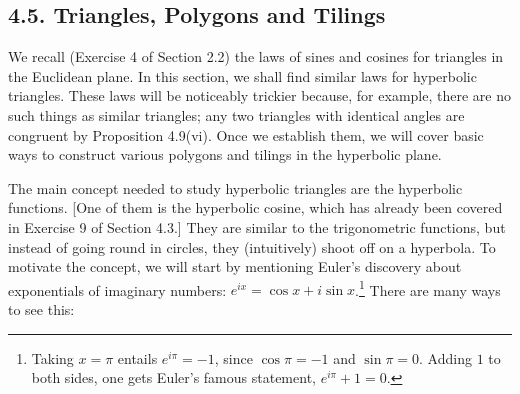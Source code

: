 \documentclass[leqno]{book}
\begin{document}
\subsection*{4.5. Triangles, Polygons and Tilings}
We recall (Exercise 4 of Section 2.2) the laws of sines and cosines for triangles in the Euclidean plane.  In this section, we shall find similar laws for hyperbolic triangles.  These laws will be noticeably trickier because, for example, there are no such things as similar triangles; any two triangles with identical angles are congruent by Proposition 4.9(vi).  Once we establish them, we will cover basic ways to construct various polygons and tilings in the hyperbolic plane.

The main concept needed to study hyperbolic triangles are the hyperbolic functions.  [One of them is the hyperbolic cosine, which has already been covered in Exercise 9 of Section 4.3.]  They are similar to the trigonometric functions, but instead of going round in circles, they (intuitively) shoot off on a hyperbola.  To motivate the concept, we will start by mentioning Euler's discovery about exponentials of imaginary numbers: $e^{ix}=\cos x+i\sin x$.\footnote{Taking $x=\pi$ entails $e^{i\pi}=-1$, since $\cos\pi=-1$ and $\sin\pi=0$.  Adding $1$ to both sides, one gets Euler's famous statement, $e^{i\pi}+1=0$.}  There are many ways to see this:
\end{document}
